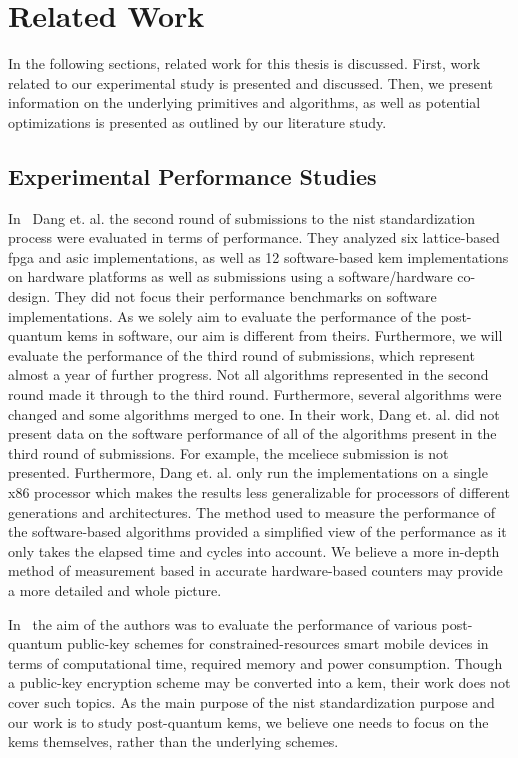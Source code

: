 \chapter{Related Work}
\label{chapter:related-work}

In the following sections, related work for this thesis is discussed. First, work related to our experimental study is presented and discussed. Then, we present information on the underlying primitives and algorithms, as well as potential optimizations is presented as outlined by our literature study.

\section{Experimental Performance Studies}

\noindent In~\cite{viet2020} Dang et. al. the second round of submissions to the \gls{nist} standardization process were evaluated in terms of performance. They analyzed six lattice-based \gls{fpga} and \gls{asic} implementations, as well as 12 software-based \gls{kem} implementations on hardware platforms as well as submissions using a software/hardware co-design. They did not focus their performance benchmarks on software implementations. As we solely aim to evaluate the performance of the \gls{post-quantum} \glspl{kem} in software, our aim is different from theirs. Furthermore, we will evaluate the performance of the third round of submissions, which represent almost a year of further progress. Not all algorithms represented in the second round made it through to the third round. Furthermore, several algorithms were changed and some algorithms merged to one. In their work, Dang et. al. did not present data on the software performance of all of the algorithms present in the third round of submissions. For example, the \gls{mceliece} submission is not presented. Furthermore, Dang et. al. only run the implementations on a single \gls{x86} processor which makes the results less generalizable for processors of different generations and architectures. The method used to measure the performance of the software-based algorithms provided a simplified view of the performance as it only takes the elapsed time and cycles into account. We believe a more in-depth method of measurement based in accurate hardware-based counters may provide a more detailed and whole picture.

In~\cite{chikouche2018} the aim of the authors was to evaluate the performance of various \gls{post-quantum} public-key schemes for constrained-resources smart mobile devices in terms of computational time, required memory and power consumption. Though a public-key encryption scheme may be converted into a \gls{kem}, their work does not cover such topics. As the main purpose of the \gls{nist} standardization purpose and our work is to study \gls{post-quantum} \glspl{kem}, we believe one needs to focus on the \glspl{kem} themselves, rather than the underlying schemes.

